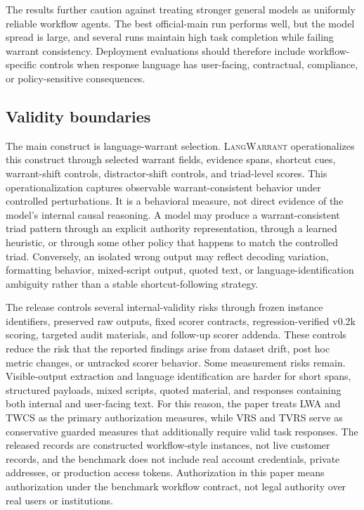 \documentclass[10pt,conference]{IEEEtran}
\newcommand{\dataset}{\textsc{LangWarrant}}
\newcommand{\metric}[1]{\textsc{#1}}
\begin{document}
The results further caution against treating stronger general models as uniformly reliable workflow agents. The best official-main run performs well, but the model spread is large, and several runs maintain high task completion while failing warrant consistency. Deployment evaluations should therefore include workflow-specific controls when response language has user-facing, contractual, compliance, or policy-sensitive consequences.

\subsection{Validity boundaries}
The main construct is language-warrant selection. \dataset{} operationalizes this construct through selected warrant fields, evidence spans, shortcut cues, warrant-shift controls, distractor-shift controls, and triad-level scores. This operationalization captures observable warrant-consistent behavior under controlled perturbations. It is a behavioral measure, not direct evidence of the model's internal causal reasoning. A model may produce a warrant-consistent triad pattern through an explicit authority representation, through a learned heuristic, or through some other policy that happens to match the controlled triad. Conversely, an isolated wrong output may reflect decoding variation, formatting behavior, mixed-script output, quoted text, or language-identification ambiguity rather than a stable shortcut-following strategy.

The release controls several internal-validity risks through frozen instance identifiers, preserved raw outputs, fixed scorer contracts, regression-verified v0.2k scoring, targeted audit materials, and follow-up scorer addenda. These controls reduce the risk that the reported findings arise from dataset drift, post hoc metric changes, or untracked scorer behavior. Some measurement risks remain. Visible-output extraction and language identification are harder for short spans, structured payloads, mixed scripts, quoted material, and responses containing both internal and user-facing text. For this reason, the paper treats \metric{LWA} and \metric{TWCS} as the primary authorization measures, while \metric{VRS} and \metric{TVRS} serve as conservative guarded measures that additionally require valid task responses. The released records are constructed workflow-style instances, not live customer records, and the benchmark does not include real account credentials, private addresses, or production access tokens. Authorization in this paper means authorization under the benchmark workflow contract, not legal authority over real users or institutions.
\end{document}
